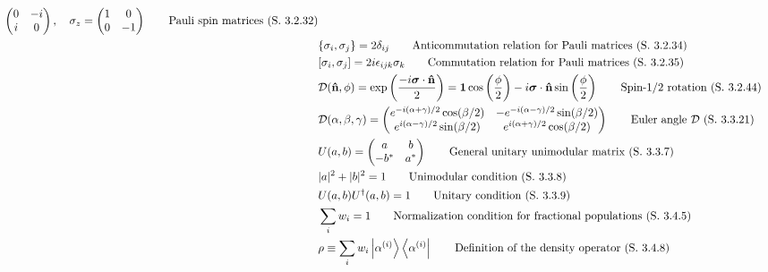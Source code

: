 \documentclass[10pt]{article}
\newcommand{\nhat}{\boldsymbol{\hat{\textbf{n}}}}
\newcommand{\ve}[1]{\boldsymbol{\mathbf{#1}}}
\newcommand{\lrp}[1]{\left( #1 \right)}
\newcommand{\herm}[1]{#1^\dagger}
\begin{document}
\begin{multicols}{2}
\begin{align*}
\begin{pmatrix}
			0 & -i \\
			i & 0 \\
		\end{pmatrix}, \quad \sigma_z = \begin{pmatrix}
			1 & 0 \\
			0 & -1 \\
		\end{pmatrix}	\tag*{Pauli spin matrices (S. 3.2.32)} \\
		& \{\sigma_i,\sigma_j\} = 2 \delta_{ij}	\tag*{Anticommutation relation for Pauli matrices (S. 3.2.34)} \\
		& [\sigma_i, \sigma_j] = 2 i \epsilon_{ijk} \sigma_k	\tag*{Commutation relation for Pauli matrices (S. 3.2.35)} \\
		& \mathcal{D}(\nhat,\phi) = \exp \lrp{\frac{-i \ve{\sigma} \cdot \nhat}{2}} = \ve{1} \cos \lrp{\frac{\phi}{2}} - i \ve{\sigma} \cdot \nhat \sin \lrp{\frac{\phi}{2}}	\tag*{Spin-1/2 rotation (S. 3.2.44)} \\
		& \mathcal{D}(\alpha, \beta, \gamma) = \begin{pmatrix}
			e^{-i(\alpha + \gamma)/2} \cos (\beta/2) & -e^{-i(\alpha - \gamma)/2} \sin (\beta/2) \\
			e^{i(\alpha - \gamma)/2} \sin (\beta/2) & e^{i(\alpha + \gamma)/2} \cos (\beta/2) \\
		\end{pmatrix}	\tag*{Euler angle $\mathcal{D}$ (S. 3.3.21)} \\
		& U(a,b) = \begin{pmatrix}
			a & b \\
			-b^* & a^* \\
		\end{pmatrix}	\tag*{General unitary unimodular matrix (S. 3.3.7)} \\
		& |a|^2 + |b|^2 = 1	\tag*{Unimodular condition (S. 3.3.8)} \\
		& U(a,b) \herm{U}(a,b) = 1	\tag*{Unitary condition (S. 3.3.9)} \\
 		& \sum_i w_i = 1	\tag*{Normalization condition for fractional populations (S. 3.4.5)} \\
		& \rho \equiv \sum_i w_i \ket{\alpha^{(i)}} \bra{ \alpha^{(i)}}	\tag*{Definition of the density operator (S. 3.4.8)} \\
	\end{align*} \newpage
	\setlength{\abovedisplayskip}{-25pt}
	\setlength{\belowdisplayskip}{0pt}
	\setlength{\abovedisplayshortskip}{0pt}
	\setlength{\belowdisplayshortskip}{0pt}
	\begin{align*} 

\end{align*}
\end{multicols}
\end{document}
